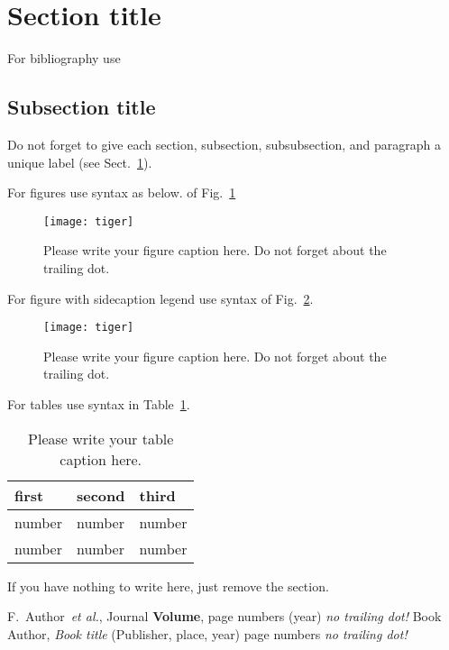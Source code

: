 \documentclass[epj]{webofc}
\begin{document}
\section{Section title}
\label{sec-1}
For bibliography use \cite{RefJ}
\subsection{Subsection title}
\label{sec-2}
Do not forget to give each section, subsection, subsubsection, and
paragraph a unique label (see Sect.~\ref{sec-1}).

For figures use syntax as below. of Fig.~\ref{fig-1}
\begin{figure}[ht]
\centering
\texttt{[image: tiger]}
\caption{Please write your figure caption here. Do not forget about the trailing dot.}
\label{fig-1}       %
\end{figure}

For figure with sidecaption legend use syntax of Fig.~\ref{fig-3}.
\begin{figure}[ht]
\centering
\sidecaption
\texttt{[image: tiger]}
\caption{Please write your figure caption here. Do not forget about the trailing dot.}
\label{fig-3}       %
\end{figure}

For tables use syntax in Table~\ref{tab-1}.
\begin{table}
\centering
\caption{Please write your table caption here.}
\label{tab-1}       %
\begin{tabular}{lll}
\hline
first & second & third  \\\hline
number & number & number \\
number & number & number \\\hline
\end{tabular}
\vspace*{5cm}  %
\end{table}

\begin{acknowledgement}
If you have nothing to write here, just remove the section.
\end{acknowledgement}
%
% 
%
%
\begin{thebibliography}{00}
%
%
F.~Author~\textit{et al.}, Journal \textbf{Volume}, page numbers (year) {\em{no trailing dot!}}
Book Author, \textit{Book title} (Publisher, place, year) page numbers {\em{no trailing dot!}}
\end{thebibliography}
\end{document}
